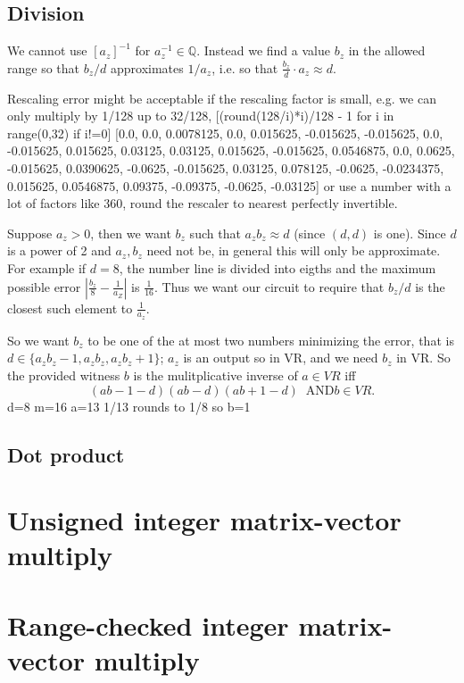 \documentclass[12pt]{amsart}
\theoremstyle{plain}
\theoremstyle{definition}
\theoremstyle{definition}
\theoremstyle{definition}
\theoremstyle{definition}
\theoremstyle{definition}
\begin{document}
\subsection{Division}
We cannot use $[a_z]^{-1}$ for $a_z^{-1} \in \mathbb{Q}$. Instead we find a value $b_z$ in the allowed range so that $b_z/d$ approximates $1/a_z$, i.e. so that $\frac{b_z}{d} \cdot a_z \approx d$.

Rescaling error might be acceptable if the rescaling factor is small, e.g. we can only multiply by 1/128 up to 32/128,
[(round(128/i)*i)/128 - 1 for i in range(0,32) if i!=0]
[0.0, 0.0, 0.0078125, 0.0, 0.015625, -0.015625, -0.015625, 0.0, -0.015625, 0.015625, 0.03125, 0.03125, 0.015625, -0.015625, 0.0546875, 0.0, 0.0625, -0.015625, 0.0390625, -0.0625, -0.015625, 0.03125, 0.078125, -0.0625, -0.0234375, 0.015625, 0.0546875, 0.09375, -0.09375, -0.0625, -0.03125]
or use a number with a lot of factors like 360, round the rescaler to nearest perfectly invertible.


Suppose $a_z >0$, then we want $b_z$ such that $a_z b_z \approx d$ (since $(d,d)$ is one).  Since $d$ is a power of 2 and $a_z,b_z$ need not be, in general this will only be approximate.
For example if $d=8$, the number line is divided into eigths and the maximum possible error $|\frac{b_z}{8} - \frac{1}{a_Z}|$ is $\frac{1}{16}$.  Thus we want our circuit to require that $b_z/d$ is the closest such element to $\frac{1}{a_z}$.

So we want $b_z$ to be one of the at most two numbers minimizing the error, that is $d \in \{a_zb_z-1,a_zb_z,a_z b_z+1\}$; $a_z$ is an output so in VR, and we need $b_z$ in VR.
So the provided witness $b$ is the mulitplicative inverse of $a \in VR$ iff 
\[
(ab-1-d)(ab-d)(ab+1-d) \;\; \text{AND} b \in VR.
\]
d=8
m=16
a=13
1/13 rounds to 1/8
so b=1

\subsection{Dot product}


\section{Unsigned integer matrix-vector multiply}


\section{Range-checked integer matrix-vector multiply}
\end{document}
